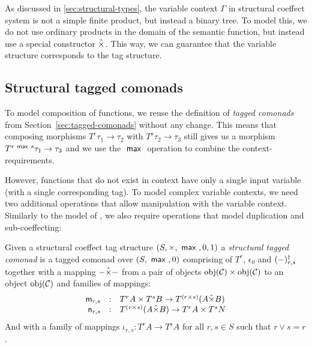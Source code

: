 As discussed in \ref{sec:structural-types}, the variable context $\Gamma$ in structural coeffect
system is not a simple finite product, but instead a binary tree. To model this, we do not use
ordinary products in the domain of the semantic function, but instead use a special 
constructor $\hat{\times}$. This way, we can guarantee that the variable structure corresponds to 
the tag structure. 

\subsection{Structural tagged comonads}
\label{sec:structural-tagged-comonads}

To model composition of functions, we reuse the definition of \emph{tagged comonads} from 
Section~\ref{sec:tagged-comonads} without any change. This means that composing morphisms
$T^r \tau_1 \rightarrow \tau_2$ with $T^s \tau_2 \rightarrow \tau_3$ still gives us a morphism
$T^{r ~\textnormal{\sffamily max}~ s} \tau_1 \rightarrow \tau_3$ and we use the $~\textnormal{\sffamily max}~$ operation to combine the 
context-requirements.

However, functions that do not exist in context have only a single input variable (with a 
single corresponding tag). To model complex variable contexts, we need two additional
operations that allow manipulation with the variable context. Similarly to the model of \clflt,
we also require operations that model duplication and sub-coeffecting:

\begin{definition}
Given a structural coeffect tag structure $(S, \times, ~\textnormal{\sffamily max}~, 0, 1)$ a \emph{structural tagged comonad} is a 
tagged comonad over $(S, ~\textnormal{\sffamily max}~, 0)$ comprising of $T^r$, $\epsilon_0$ and
$(-)^\dagger_{r, s}$ together with a mapping $- \hat{\times} -$ from a pair of objects 
$\textnormal{obj}(\mathcal{C}) \times \textnormal{obj}(\mathcal{C})$ to an object $\textnormal{obj}(\mathcal{C})$ and families of mappings:
%
\begin{equation*}
\begin{array}{rcl}
\textnormal{\sffamily m}_{r, s} &:& T^r A \times T^s B \rightarrow T^{(r \times s)}(A \hat{\times} B)\\
\textnormal{\sffamily n}_{r, s} &:& T^{(r \times s)}(A \hat{\times} B) \rightarrow T^r A \times T^s N\\
\end{array}
\end{equation*}
%
%
And with a family of mappings $\iota_{r, s} : T^r A \rightarrow T^s A$ for all $r, s \in S$ such that $r \vee s = r$.
%
%
\end{definition}

